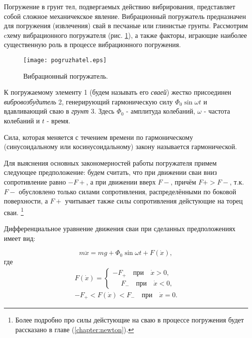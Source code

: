 Погружение в грунт тел, подвергаемых действию вибрирования, представляет собой сложное механичекское явление. Вибрационный
погружатель предназначен для погружения (извлечения) свай в песчаные или глинистые грунты. Рассмотрим cхему вибрационного
погружателя (рис. \ref{fig:vp}), а также факторы, играющие наиболее существенную роль в процессе вибрационного погружения.

\begin{figure}[h]
    \centering
    \texttt{[image: pogruzhatel.eps]}
    \caption{Вибрационный погружатель.}
    \label{fig:vp}
\end{figure}

\noindent К погружаемому элементу 1 (будем называть его \textit{сваей}) жестко присоединен \textit{вибровозбудитель} 2,
генерирующий гармоническую силу $\Phi_0 \sin \omega t$ и вдавливающий сваю в \textit{грунт} 3. Здесь $\Phi_0$ - амплитуда
колебаний, $\omega$ - частота колебаний и $t$ - время.

\begin{definition}
    Сила, которая меняется с течением времени по гармоническому (синусоидальному или косинусоидальному)
    закону называется гармонической.
\end{definition}

Для выяснения основных закономерностей работы погружателя примем следующее предположение: будем считать, что
при движении сваи вниз сопротивление равно $-F+$, а при движении вверх $F-$, причём $F+ > F-$, т.к. $F-$ обусловлено только
силами сопротивления, распределёнными по боковой поверхности, а $F+$ учитывает также силы сопротивления дейстующие на
торец сваи. \footnote{Более подробно про силы дейстующие на сваю в процессе погружения будет рассказано
в главе (\ref{chapter:newton}).}

Дифференциальное уравнение движения сваи при сделанных предположениях имеет вид:

\begin{equation}
    m\ddot{x} = mg + \Phi_0 \sin \omega t + F(\dot{x}),
\end{equation}
где
\begin{equation}
    \begin{aligned}
        F(\dot{x}) =
        \begin{cases}
            -F_+ \quad \text{при} \quad \dot{x} > 0,\\
            \phantom{-}F_- \quad \text{при} \quad \dot{x} < 0,
        \end{cases}\\
        -F_+ < F(\dot{x}) < F_- \quad \text{при} \quad \dot{x} = 0.
    \end{aligned}
\end{equation}

